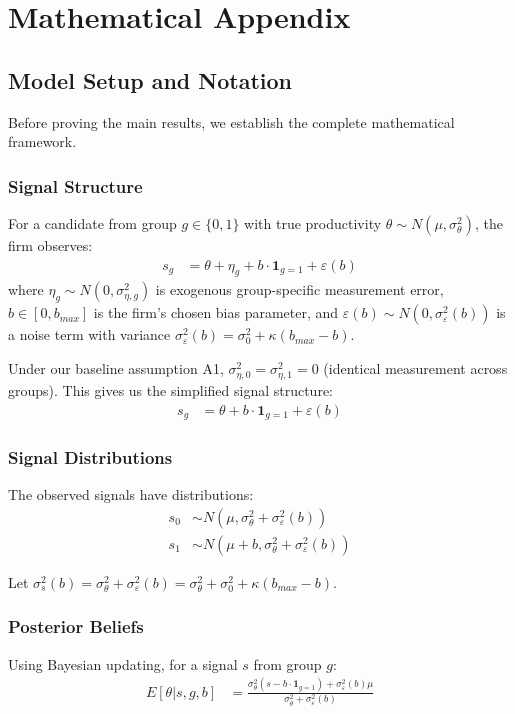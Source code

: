 \section{Mathematical Appendix}

\subsection{Model Setup and Notation}

Before proving the main results, we establish the complete mathematical framework.

\subsubsection{Signal Structure}
For a candidate from group $g \in \{0,1\}$ with true productivity $\theta \sim N(\mu, \sigma_\theta^2)$, the firm observes:
\begin{align}
s_g &= \theta + \eta_g + b \cdot \mathbf{1}_{g=1} + \varepsilon(b)
\end{align}
where $\eta_g \sim N(0, \sigma_{\eta,g}^2)$ is exogenous group-specific measurement error, $b \in [0, b_{max}]$ is the firm's chosen bias parameter, and $\varepsilon(b) \sim N(0, \sigma_\varepsilon^2(b))$ is a noise term with variance $\sigma_\varepsilon^2(b) = \sigma_0^2 + \kappa(b_{max} - b)$.

Under our baseline assumption A1, $\sigma_{\eta,0}^2 = \sigma_{\eta,1}^2 = 0$ (identical measurement across groups). This gives us the simplified signal structure:
\begin{align}
s_g &= \theta + b \cdot \mathbf{1}_{g=1} + \varepsilon(b)
\end{align}

\subsubsection{Signal Distributions}
The observed signals have distributions:
\begin{align}
s_0 &\sim N(\mu, \sigma_\theta^2 + \sigma_\varepsilon^2(b)) \\
s_1 &\sim N(\mu + b, \sigma_\theta^2 + \sigma_\varepsilon^2(b))
\end{align}

Let $\sigma_s^2(b) = \sigma_\theta^2 + \sigma_\varepsilon^2(b) = \sigma_\theta^2 + \sigma_0^2 + \kappa(b_{max} - b)$.

\subsubsection{Posterior Beliefs}
Using Bayesian updating, for a signal $s$ from group $g$:
\begin{align}
E[\theta | s, g, b] &= \frac{\sigma_\theta^2 (s - b \cdot \mathbf{1}_{g=1}) + \sigma_\varepsilon^2(b) \mu}{\sigma_\theta^2 + \sigma_\varepsilon^2(b)} \label{eq:posterior}
\end{align}

